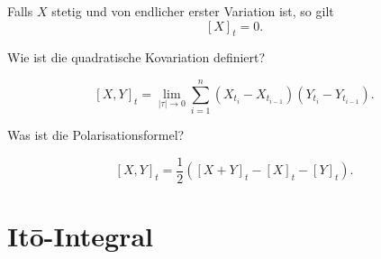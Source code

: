 \begin{QandA}
\begin{answered}
        Falls $X$ stetig und von endlicher erster Variation ist, so gilt
        \[
            [X]_{t} = 0.
        \]
    \end{answered}

    \item Wie ist die quadratische Kovariation definiert?
    \begin{answered}
        \[
            [X,Y]_{t} = \lim_{|\tau |\to 0} \sum_{i=1}^{n} (X_{t_{i}}-X_{t_{i-1}})(Y_{t_{i}}-Y_{t_{i-1}}).
        \]
    \end{answered}

    \item Was ist die Polarisationsformel?
    \begin{answered}
        \[
            [X,Y]_{t} = \frac{1}{2} ([X+Y]_{t} - [X]_{t} - [Y]_{t}).
        \]
    \end{answered}
\end{QandA}

\newpage
\section*{Itō-Integral}

